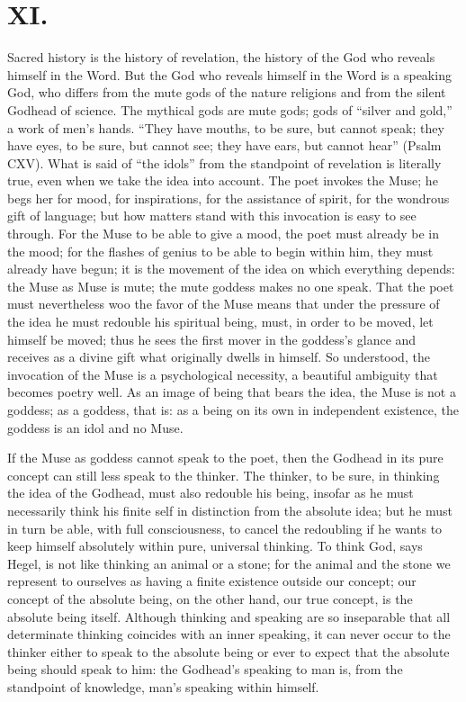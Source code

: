 \documentclass[12pt]{book}
\newcommand{\opage}[1]{\marginnote{\footnotesize\textit{[#1]}}}
\begin{document}
\chapter*{XI.}
\label{ch:xi}
\opage{176}\setcounter{footnote}{0}%
Sacred history is the history of revelation, the history of the God who
reveals himself in the Word. But the God who reveals himself in the Word
is a speaking God, who differs from the mute gods of the nature religions
and from the silent Godhead of science. The mythical gods are mute gods;
gods of ``silver and gold,'' a work of men's hands. ``They have mouths,
to be sure, but cannot speak; they have eyes, to be sure, but cannot see;
they have ears, but cannot hear'' (Psalm CXV).
What is said of ``the idols'' from the standpoint of revelation is
literally true, even when we take the idea into account. The poet invokes
the Muse; he begs her for mood, for inspirations, for the assistance of
spirit, for the wondrous gift of language; but how matters stand with this
invocation is easy to see through. For the Muse to be able to give a mood,
the poet must already be in the mood; for the flashes of genius to be able
to begin within him, they must already have begun; it is the movement of
the idea on which everything depends: the Muse as Muse is mute; the mute
goddess makes no one speak. That the poet must nevertheless woo the favor
of the Muse means that under the pressure of the idea he must redouble his
spiritual being, must, in order to be moved, let himself
\opage{177}\setcounter{footnote}{0}%
be moved; thus he sees the first mover in the goddess's glance and
receives as a divine gift what originally dwells in himself. So
understood, the invocation of the Muse is a psychological necessity, a
beautiful ambiguity that becomes poetry well. As an image of being that
bears the idea, the Muse is not a goddess; as a goddess, that is: as a
being on its own in independent existence, the goddess is an idol and no
Muse.

If the Muse as goddess cannot speak to the poet, then the Godhead in its
pure concept can still less speak to the thinker. The thinker, to be sure,
in thinking the idea of the Godhead, must also redouble his being, insofar
as he must necessarily think his finite self in distinction from the
absolute idea; but he must in turn be able, with full consciousness, to
cancel the redoubling if he wants to keep himself absolutely within pure,
universal thinking. To think God, says Hegel, is not like thinking an
animal or a stone; for the animal and the stone we represent to ourselves
as having a finite existence outside our concept; our concept of the
absolute being, on the other hand, our true concept, is the absolute being
itself. Although thinking and speaking are so inseparable that all
determinate thinking coincides with an inner speaking, it can never occur
to the thinker either to speak to the absolute being or ever to expect that
the absolute being should speak to him: the Godhead's speaking to man is,
from the standpoint of knowledge, man's speaking within himself.
\end{document}
